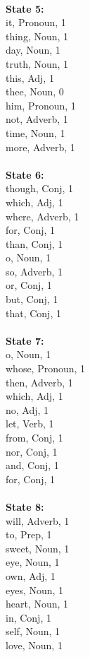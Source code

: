 \begin{multicols}{4}
\\
\textbf{State 5:} \\
it, Pronoun, 1\\
thing, Noun, 1\\
day, Noun, 1\\
truth, Noun, 1\\
this, Adj, 1\\
thee, Noun, 0\\
him, Pronoun, 1\\
not, Adverb, 1\\
time, Noun, 1\\
more, Adverb, 1\\
\\
\textbf{State 6:} \\
though, Conj, 1\\
which, Adj, 1\\
where, Adverb, 1\\
for, Conj, 1\\
than, Conj, 1\\
o, Noun, 1\\
so, Adverb, 1\\
or, Conj, 1\\
but, Conj, 1\\
that, Conj, 1\\
\\
\textbf{State 7:} \\
o, Noun, 1\\
whose, Pronoun, 1\\
then, Adverb, 1\\
which, Adj, 1\\
no, Adj, 1\\
let, Verb, 1\\
from, Conj, 1\\
nor, Conj, 1\\
and, Conj, 1\\
for, Conj, 1\\
\\
\textbf{State 8:} \\
will, Adverb, 1\\
to, Prep, 1\\
sweet, Noun, 1\\
eye, Noun, 1\\
own, Adj, 1\\
eyes, Noun, 1\\
heart, Noun, 1\\
in, Conj, 1\\
self, Noun, 1\\
love, Noun, 1\\

\end{multicols}

